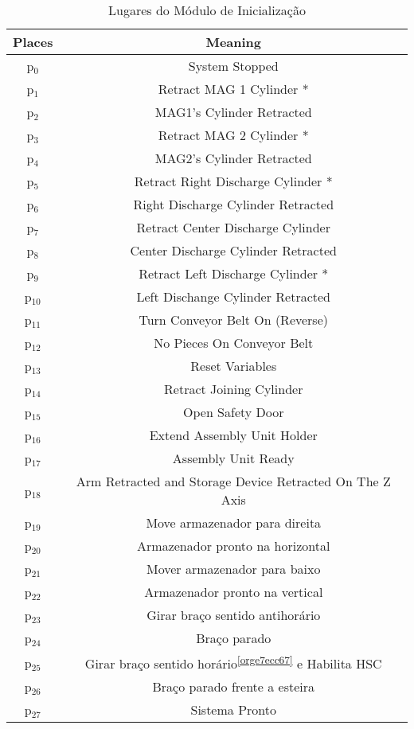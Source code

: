 \begin{table}[htbp]
\caption{Lugares do Módulo de Inicialização}
\centering
\begin{tabular}{c|c}
Places & Meaning\\
\hline
p\(_{\text{0}}\) & System Stopped\\
p\(_{\text{1}}\) & Retract MAG 1 Cylinder *\\
p\(_{\text{2}}\) & MAG1's Cylinder Retracted\\
p\(_{\text{3}}\) & Retract MAG 2 Cylinder *\\
p\(_{\text{4}}\) & MAG2's Cylinder Retracted\\
p\(_{\text{5}}\) & Retract Right Discharge Cylinder *\\
p\(_{\text{6}}\) & Right Discharge Cylinder Retracted\\
p\(_{\text{7}}\) & Retract Center Discharge Cylinder\\
p\(_{\text{8}}\) & Center Discharge Cylinder Retracted\\
p\(_{\text{9}}\) & Retract Left Discharge Cylinder *\\
p\(_{\text{10}}\) & Left Dischange Cylinder Retracted\\
p\(_{\text{11}}\) & Turn Conveyor Belt On (Reverse)\\
p\(_{\text{12}}\) & No Pieces On Conveyor Belt\\
p\(_{\text{13}}\) & Reset Variables\footnotemark\\
p\(_{\text{14}}\) & Retract Joining Cylinder\\
p\(_{\text{15}}\) & Open Safety Door\\
p\(_{\text{16}}\) & Extend Assembly Unit Holder\\
p\(_{\text{17}}\) & Assembly Unit Ready\\
p\(_{\text{18}}\) & Arm Retracted and Storage Device Retracted On The Z Axis\\
p\(_{\text{19}}\) & Move armazenador para direita\\
p\(_{\text{20}}\) & Armazenador pronto na horizontal\\
p\(_{\text{21}}\) & Mover armazenador para baixo\\
p\(_{\text{22}}\) & Armazenador pronto na vertical\\
p\(_{\text{23}}\) & Girar braço sentido antihorário\footnotemark\\
p\(_{\text{24}}\) & Braço parado\\
p\(_{\text{25}}\) & Girar braço sentido horário\textsuperscript{\ref{orge7ecc67}} e Habilita HSC\\
p\(_{\text{26}}\) & Braço parado frente a esteira\\
p\(_{\text{27}}\) & Sistema Pronto\\
\end{tabular}
\end{table}

